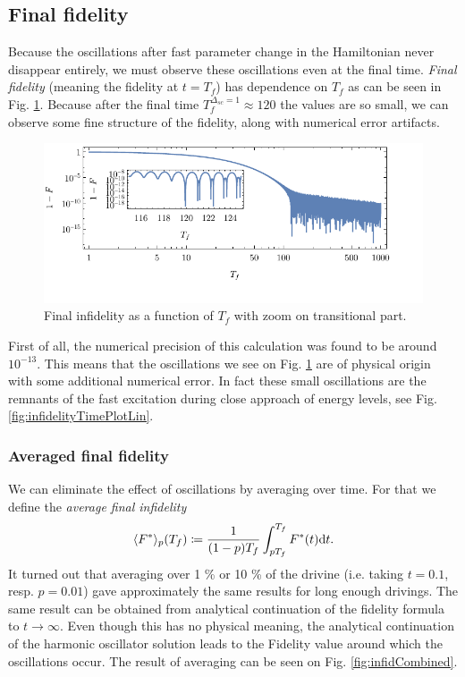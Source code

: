 \subsection{Final fidelity}
Because the oscillations after fast parameter change in the Hamiltonian never disappear entirely, we must observe these oscillations even at the final time. \emph{Final fidelity} (meaning the fidelity at $t=T_f$) has dependence on $T_f$ as can be seen in Fig. \ref{fig:infidelityTfPlotLogLinCombined}. Because after the final time $T_f^{\Delta_{sc}=1}\approx 120$ the values are so small, we can observe some fine structure of the fidelity, along with numerical error artifacts.
\begin{figure}[H]
    \centering
    \includegraphics[scale=1.2]{../img/infidelityTfPlotLogLinCombined1.pdf}
    \caption{Final infidelity as a function of $T_f$ with zoom on transitional part.}
    \label{fig:infidelityTfPlotLogLinCombined}
\end{figure}

First of all, the numerical precision of this calculation was found to be around $10^{-13}$. This means that the oscillations we see on Fig. \ref{fig:infidelityTfPlotLogLinCombined} are of physical origin with some additional numerical error. In fact these small oscillations are the remnants of the fast excitation during close approach of energy levels, see Fig. \ref{fig:infidelityTimePlotLin}. 



\subsubsection{Averaged final fidelity}
We can eliminate the effect of oscillations by averaging over time. For that we define the \emph{average final infidelity}
\begin{equation}
    \langle F^*\rangle_p(T_f) \coloneqq \frac{1}{(1-p) T_f}\int_{p T_f}^{T_f} F^*(t)\mathrm{d} t.
\end{equation}
It turned out that averaging over 1 \% or 10 \% of the drivine (i.e. taking $t=0.1$, resp. $p=0.01$) gave approximately the same results for long enough drivings. The same result can be obtained from analytical continuation of the fidelity formula to $t\rightarrow  \infty$. Even though this has no physical meaning, the analytical continuation of the harmonic oscillator solution leads to the Fidelity value around which the oscillations occur. The result of averaging can be seen on Fig. \ref{fig:infidCombined}.

